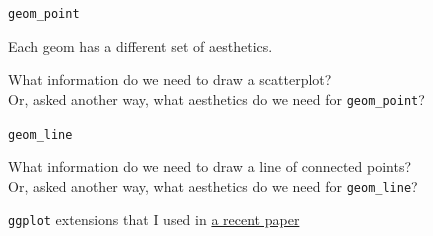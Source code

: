 \documentclass[table]{beamer}\usepackage[]{graphicx}\usepackage[]{color}
\begin{document}
\begin{frame}[fragile]{\tt{geom\_point}}


Each geom has a different set of aesthetics.

What information do we need to draw a scatterplot? \\
Or, asked another way, what aesthetics do we need for {\tt geom\_point}?

\end{frame}


\begin{frame}[fragile]{\tt{geom\_line}}

What information do we need to draw a line of connected points? \\
Or, asked another way, what aesthetics do we need for {\tt geom\_line}?

\end{frame}



\begin{frame}[fragile]{}

\centering
\Large
{\tt ggplot} extensions that I used in \href{https://www.medrxiv.org/content/10.1101/2021.02.03.21250974v1}{a recent paper}

\end{frame}
\end{document}
